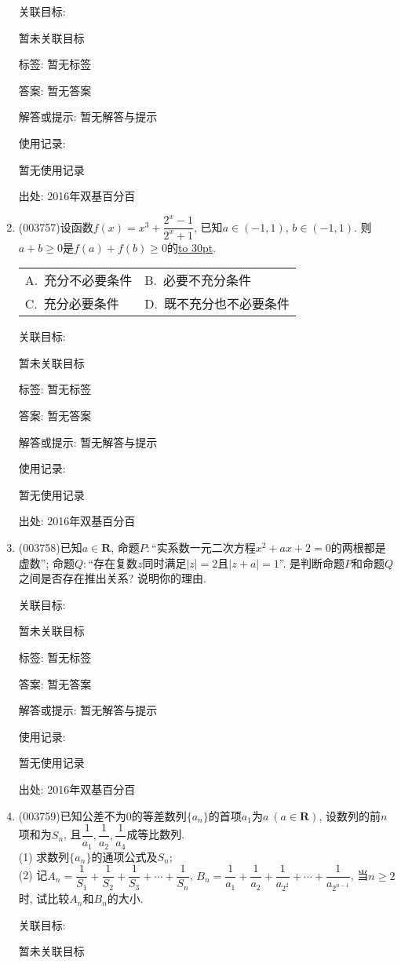 \documentclass[10pt,a4paper]{article}
\newcommand{\blank}[1]{\underline{\hbox to #1pt{}}}
\newcommand{\twoch}[4]{\par\begin{tabular}{p{.46\textwidth}p{.46\textwidth}}
A.~#1& B.~#2\\
C.~#3& D.~#4
\end{tabular}}
\begin{document}
\begin{enumerate}[1.]
关联目标:

暂未关联目标



标签: 暂无标签

答案: 暂无答案

解答或提示: 暂无解答与提示

使用记录:

暂无使用记录


出处: 2016年双基百分百
\item { (003757)}设函数$f(x)=x^3+\dfrac{2^x-1}{2^x+1}$, 已知$a\in (-1,1)$, $b\in (-1,1)$. 则$a+b\ge 0$是$f(a)+f(b)\ge 0$的\blank{30}.
\twoch{充分不必要条件}{必要不充分条件}{充分必要条件}{既不充分也不必要条件}


关联目标:

暂未关联目标



标签: 暂无标签

答案: 暂无答案

解答或提示: 暂无解答与提示

使用记录:

暂无使用记录


出处: 2016年双基百分百
\item { (003758)}已知$a\in\mathbf{R}$, 命题$P:$``实系数一元二次方程$x^2+ax+2=0$的两根都是虚数''; 命题$Q:$``存在复数$z$同时满足$|z|=2$且$|z+a|=1$''.
是判断命题$P$和命题$Q$之间是否存在推出关系? 说明你的理由.


关联目标:

暂未关联目标



标签: 暂无标签

答案: 暂无答案

解答或提示: 暂无解答与提示

使用记录:

暂无使用记录


出处: 2016年双基百分百
\item { (003759)}已知公差不为$0$的等差数列$\{a_n\}$的首项$a_1$为$a \ (a\in \mathbf{R})$, 设数列的前$n$项和为$S_n$, 且$\dfrac{1}{a_1},\dfrac{1}{a_2},\dfrac{1}{a_4}$成等比数列.\\
(1) 求数列$\{a_n\}$的通项公式及$S_n$;\\
(2) 记$A_n=\dfrac{1}{S_1}+\dfrac{1}{S_2}+\dfrac{1}{S_3}+\cdots+\dfrac{1}{S_n}$, $B_n=\dfrac{1}{a_1}+\dfrac{1}{a_2}+\dfrac{1}{a_{2^2}}+\cdots+\dfrac{1}{a_{2^{n-1}}}$, 当$n\ge 2$时, 试比较$A_n$和$B_n$的大小.


关联目标:

暂未关联目标




\end{enumerate}
\end{document}
